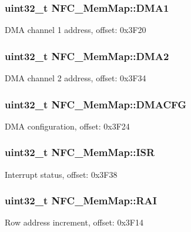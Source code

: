 \subsubsection[{D\+M\+A1}]{\setlength{\rightskip}{0pt plus 5cm}uint32\+\_\+t N\+F\+C\+\_\+\+Mem\+Map\+::\+D\+M\+A1}\label{struct_n_f_c___mem_map_a32bec2bfd84ae10fe9ddaaab24ff5c22}
D\+M\+A channel 1 address, offset\+: 0x3\+F20 \hypertarget{struct_n_f_c___mem_map_aa2667641c24abf862e7607182a7be1cb}{}
\subsubsection[{D\+M\+A2}]{\setlength{\rightskip}{0pt plus 5cm}uint32\+\_\+t N\+F\+C\+\_\+\+Mem\+Map\+::\+D\+M\+A2}\label{struct_n_f_c___mem_map_aa2667641c24abf862e7607182a7be1cb}
D\+M\+A channel 2 address, offset\+: 0x3\+F34 \hypertarget{struct_n_f_c___mem_map_a2298f2d3e420d2c1fce42acf53f21162}{}
\subsubsection[{D\+M\+A\+C\+F\+G}]{\setlength{\rightskip}{0pt plus 5cm}uint32\+\_\+t N\+F\+C\+\_\+\+Mem\+Map\+::\+D\+M\+A\+C\+F\+G}\label{struct_n_f_c___mem_map_a2298f2d3e420d2c1fce42acf53f21162}
D\+M\+A configuration, offset\+: 0x3\+F24 \hypertarget{struct_n_f_c___mem_map_ab881e0b3bb6ef5ea9a34096c0968cedb}{}
\subsubsection[{I\+S\+R}]{\setlength{\rightskip}{0pt plus 5cm}uint32\+\_\+t N\+F\+C\+\_\+\+Mem\+Map\+::\+I\+S\+R}\label{struct_n_f_c___mem_map_ab881e0b3bb6ef5ea9a34096c0968cedb}
Interrupt status, offset\+: 0x3\+F38 \hypertarget{struct_n_f_c___mem_map_ac1117c3d35d9348dac417db834474995}{}
\subsubsection[{R\+A\+I}]{\setlength{\rightskip}{0pt plus 5cm}uint32\+\_\+t N\+F\+C\+\_\+\+Mem\+Map\+::\+R\+A\+I}\label{struct_n_f_c___mem_map_ac1117c3d35d9348dac417db834474995}
Row address increment, offset\+: 0x3\+F14 \hypertarget{struct_n_f_c___mem_map_a3f377c9911d9d67731bb4df00fdfd4ce}{}
